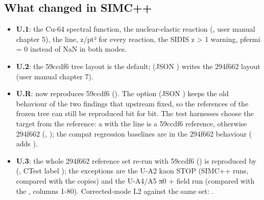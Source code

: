 \subsection*{\texorpdfstring{What changed in SIMC++}{What changed in SIMC++}}\label{translation_report-07u5ffollowingu5fupstream:what-changed-in-simc}
\begin{itemize}
\item \textbf{U.1}: the Cu-64 spectral function, the nuclear-elastic reaction (, user manual chapter 5), the
 line, z/pt² for every reaction, the SIDIS z > 1 warning, pfermi = 0 instead of NaN in both modes.
\item \textbf{U.2}: the 59ccdf6 tree layout is the default;  (JSON ) writes
the 294f662 layout (user manual chapter 7).
\item \textbf{U.R}:  now reproduces 59ccdf6 (). The option  (JSON
) keeps the old behaviour of the two findings that upstream fixed, so the
references of the frozen tree can still be reproduced bit for bit. The test harnesses choose the target from the
reference: a  with the line  is a 59ccdf6 reference, otherwise 294f662
(, ); the compat regression baselines are
in the 294f662 behaviour ( adds ).
\item \textbf{U.3}: the whole 294f662 reference set re-run with 59ccdf6 () is reproduced by
 (, CTest label ); the exceptions are
the U-A2 kaon STOP (SIMC++ runs, compared with the  copies) and the U-A4/A5 π0 + field run (compared with the
, columns 1-80). Corrected-mode L2 against the same set: .
\end{itemize}
